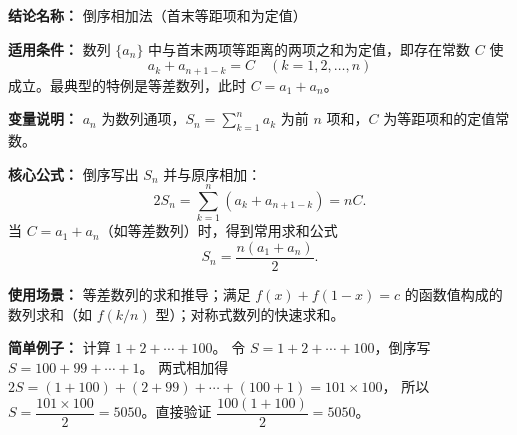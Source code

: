 \textbf{结论名称：} 倒序相加法（首末等距项和为定值）

\textbf{适用条件：} 数列 $\{a_n\}$ 中与首末两项等距离的两项之和为定值，即存在常数 $C$ 使
\[
a_k + a_{n+1-k} = C \quad (k=1,2,\dots,n)
\]
成立。最典型的特例是等差数列，此时 $C = a_1 + a_n$。

\textbf{变量说明：} $a_n$ 为数列通项，$S_n = \sum_{k=1}^n a_k$ 为前 $n$ 项和，$C$ 为等距项和的定值常数。

\textbf{核心公式：} 
倒序写出 $S_n$ 并与原序相加：
\[
2S_n = \sum_{k=1}^n (a_k + a_{n+1-k}) = nC.
\]
当 $C = a_1 + a_n$（如等差数列）时，得到常用求和公式
\[
\boxed{S_n = \frac{n(a_1 + a_n)}{2}}.
\]

\textbf{使用场景：} 等差数列的求和推导；满足 $f(x)+f(1-x)=c$ 的函数值构成的数列求和（如 $f(k/n)$ 型）；对称式数列的快速求和。

\textbf{简单例子：} 
计算 $1+2+\cdots+100$。
令 $S = 1+2+\cdots+100$，倒序写 $S = 100+99+\cdots+1$。
两式相加得 $2S = (1+100)+(2+99)+\cdots+(100+1) = 101 \times 100$，
所以 $S = \dfrac{101 \times 100}{2} = 5050$。直接验证 $\dfrac{100(1+100)}{2}=5050$。